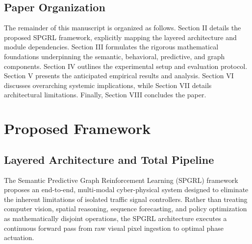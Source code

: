 \documentclass[journal]{IEEEtran}
\begin{document}
\subsection{Paper Organization}
The remainder of this manuscript is organized as follows. Section II details the proposed SPGRL framework, explicitly mapping the layered architecture and module dependencies. Section III formulates the rigorous mathematical foundations underpinning the semantic, behavioral, predictive, and graph components. Section IV outlines the experimental setup and evaluation protocol. Section V presents the anticipated empirical results and analysis. Section VI discusses overarching systemic implications, while Section VII details architectural limitations. Finally, Section VIII concludes the paper.




\section{Proposed Framework}
\label{sec:proposed_framework}

\subsection{Layered Architecture and Total Pipeline}
The Semantic Predictive Graph Reinforcement Learning (SPGRL) framework proposes an end-to-end, multi-modal cyber-physical system designed to eliminate the inherent limitations of isolated traffic signal controllers. Rather than treating computer vision, spatial reasoning, sequence forecasting, and policy optimization as mathematically disjoint operations, the SPGRL architecture executes a continuous forward pass from raw visual pixel ingestion to optimal phase actuation. 
\end{document}
